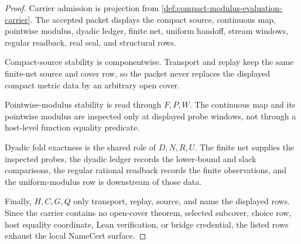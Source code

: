 \begin{proof}
Carrier admission is projection from \autoref{def:compact-modulus-evaluation-carrier}. The accepted packet displays the compact source, continuous map, pointwise modulus, dyadic ledger, finite net, uniform handoff, stream windows, regular readback, real seal, and structural rows.

Compact-source stability is componentwise. Transport and replay keep the same finite-net source and cover row, so the packet never replaces the displayed compact metric data by an arbitrary open cover.

Pointwise-modulus stability is read through $F,P,W$. The continuous map and its pointwise modulus are inspected only at displayed probe windows, not through a host-level function equality predicate.

Dyadic fold exactness is the shared role of $D,N,R,U$. The finite net supplies the inspected probes, the dyadic ledger records the lower-bound and slack comparisons, the regular rational readback records the finite observations, and the uniform-modulus row is downstream of those data.

Finally, $H,C,G,Q$ only transport, replay, source, and name the displayed rows. Since the carrier contains no open-cover theorem, selected subcover, choice row, host equality coordinate, Lean verification, or bridge credential, the listed rows exhaust the local NameCert surface.
\end{proof}

